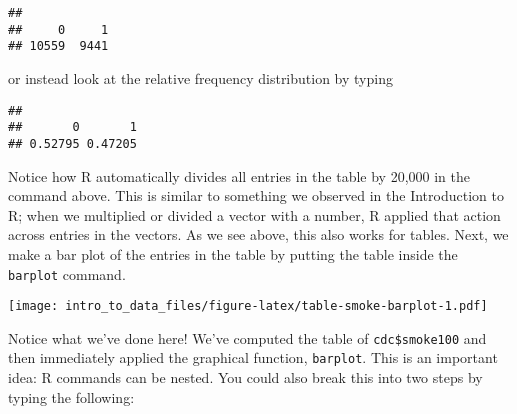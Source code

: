 \documentclass[]{article}
\newenvironment{Shaded}{\begin{snugshade}}{\end{snugshade}}
\newcommand{\KeywordTok}[1]{\textcolor[rgb]{0.13,0.29,0.53}{\textbf{#1}}}
\newcommand{\DecValTok}[1]{\textcolor[rgb]{0.00,0.00,0.81}{#1}}
\newcommand{\StringTok}[1]{\textcolor[rgb]{0.31,0.60,0.02}{#1}}
\newcommand{\OperatorTok}[1]{\textcolor[rgb]{0.81,0.36,0.00}{\textbf{#1}}}
\newcommand{\NormalTok}[1]{#1}
\begin{document}
\begin{Shaded}
\end{Shaded}

\begin{verbatim}
## 
##     0     1 
## 10559  9441
\end{verbatim}

or instead look at the relative frequency distribution by typing

\begin{Shaded}
\end{Shaded}

\begin{verbatim}
## 
##       0       1 
## 0.52795 0.47205
\end{verbatim}

Notice how R automatically divides all entries in the table by 20,000 in
the command above. This is similar to something we observed in the
Introduction to R; when we multiplied or divided a vector with a number,
R applied that action across entries in the vectors. As we see above,
this also works for tables. Next, we make a bar plot of the entries in
the table by putting the table inside the \texttt{barplot} command.

\begin{Shaded}
\end{Shaded}

\texttt{[image: intro\_to\_data\_files/figure-latex/table-smoke-barplot-1.pdf]}

Notice what we've done here! We've computed the table of
\texttt{cdc\$smoke100} and then immediately applied the graphical
function, \texttt{barplot}. This is an important idea: R commands can be
nested. You could also break this into two steps by typing the
following:

\begin{Shaded}
\end{Shaded}
\end{document}
